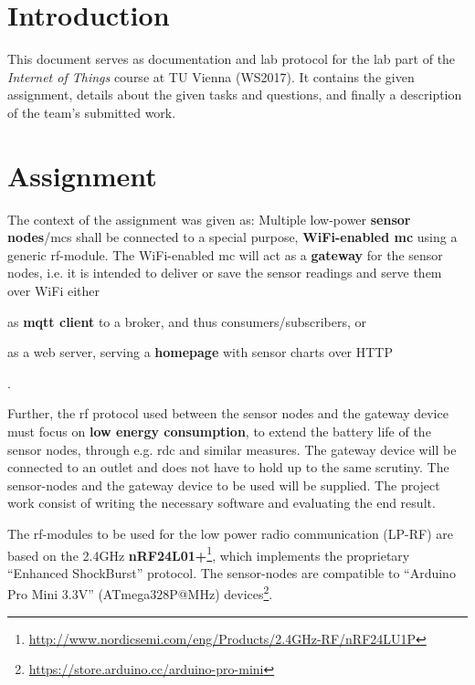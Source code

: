 
\setcounter{page}{1} %

\section{Introduction}

This document serves as documentation and lab protocol for the lab part of the \textit{Internet of Things} course at TU Vienna (WS2017). It contains the given assignment, details about the given tasks and questions, and finally a description of the team's submitted work.


\section{Assignment}
\label{sec:assignment}

The context of the assignment was given as: Multiple low-power \textbf{sensor nodes}/\glspl{mc} shall be connected to a special purpose, \textbf{WiFi-enabled \gls{mc}} using a generic \gls{rf}-module. The WiFi-enabled \gls{mc} will act as a \textbf{gateway} for the sensor nodes, i.e. it is intended to deliver or save the sensor readings and serve them over WiFi either
\begin{enumerate*}[label=(\alph*)]
  \item as \textbf{\gls{mqtt} client} to a broker, and thus consumers/subscribers, or
  \item as a web server, serving a \textbf{homepage} with sensor charts over HTTP
\end{enumerate*}.

Further, the \gls{rf} protocol used between the sensor nodes and the gateway device must focus on \textbf{low energy consumption}, to extend the battery life of the sensor nodes, through e.g. \gls{rdc} and similar measures. The gateway device will be connected to an outlet and does not have to hold up to the same scrutiny. The sensor-nodes and the gateway device to be used will be supplied. The project work consist of writing the necessary software and evaluating the end result.

The \gls{rf}-modules to be used for the low power radio communication (LP-RF) are based on the 2.4GHz \textbf{nRF24L01+}\footnote{\url{http://www.nordicsemi.com/eng/Products/2.4GHz-RF/nRF24LU1P}}, which implements the proprietary ``Enhanced ShockBurst'' protocol. The sensor-nodes are compatible to ``Arduino Pro Mini 3.3V'' (ATmega328P@MHz) devices\footnote{\url{https://store.arduino.cc/arduino-pro-mini}}.

